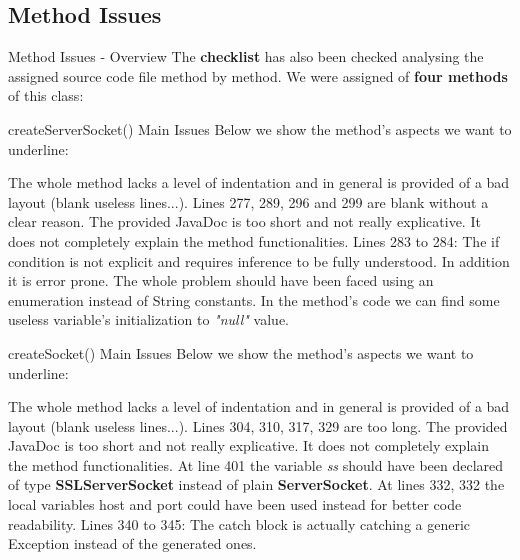 \documentclass{../common/latex_classes/pdf_presentation}
\begin{document}
	\subsection{Method Issues}
	
	\begin{frame}{Method Issues - Overview}
		The \textbf{checklist} has also been checked analysing the assigned source code file method by method.
		We were assigned of \textbf{four methods} of this class:
		\begin{itemize}
		\end{itemize}
	\end{frame}
	
	\begin{frame}{createServerSocket() Main Issues}
		Below we show the method's aspects we want to underline:
		\begin{itemize}
			 The whole method 	lacks a level of indentation and in general is provided of a bad layout (blank useless lines...).
			 Lines 277, 289, 296 and 299 are blank without a clear reason.
			 The provided JavaDoc is too short and not really explicative. It does not completely explain the method functionalities.
			 Lines 283 to 284: The if condition is not explicit and requires inference to be fully understood. In addition it is error prone. The whole problem should have been faced using an enumeration instead of String constants.
			 In the method's code we can find some useless variable's initialization to \textit{"null"} value.
		\end{itemize}
	\end{frame}
	
	\begin{frame}{createSocket() Main Issues}
		Below we show the method's aspects we want to underline:
		\begin{itemize}
			 The whole method 	lacks a level of indentation and in general is provided of a bad layout (blank useless lines...).
			 Lines 304, 310, 317, 329 are too long.
			 The provided JavaDoc is too short and not really explicative. It does not completely explain the method functionalities.
			 At line 401 the variable \textit{ss} should have been declared of type \textbf{SSLServerSocket} instead of plain \textbf{ServerSocket}.
			 At lines 332, 332 the local variables host and port could have been used instead for better code readability.
			 Lines 340 to 345: The catch block is actually catching a generic Exception instead of the generated ones.
		\end{itemize}
	\end{frame}
	
\end{document}
